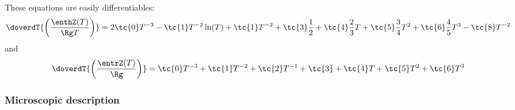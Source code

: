 %
These equations are easily differentiables:
\begin{equation}
\doverdT{\left(\frac{\enthZ(T)}{\Rg T}\right)} 
                     =   2 \tc{0} T^{-3} 
                       - \tc{1} T^{-2} \ln(T)
                       + \tc{1} T^{-2}
                       + \tc{3} \frac{1}{2}
                       + \tc{4} \frac{2}{3} T
                       + \tc{5} \frac{3}{4} T^2
                       + \tc{6} \frac{4}{5} T^3
                       - \tc{8} T^{-2}
\label{therm:dDH_dT}
\end{equation}
and
\begin{equation}
\doverdT{\left(\frac{\entrZ(T)}{\Rg}\right)} 
                     =   \tc{0} T^{-3}
                       + \tc{1} T^{-2}
                       + \tc{2} T^{-1}
                       + \tc{3}
                       + \tc{4} T
                       + \tc{5} T^2
                       + \tc{6} T^3
\label{therm:dDS_dT}
\end{equation}

\subsubsection{Microscopic description}
